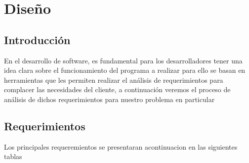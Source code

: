 \chapter{Diseño}


\section{Introducción}

En el desarrollo de software, es fundamental para los desarrolladores tener una idea clara sobre el funcionamiento del programa a realizar para ello se basan en herramientas que les permiten realizar el análisis de requerimientos para complacer las necesidades del cliente, a continuación veremos el proceso de análisis de dichos requerimientos para nuestro problema en particular

\section{Requerimientos}
Los principales requeremientos se presentaran acontinuacion en las siguientes tablas

